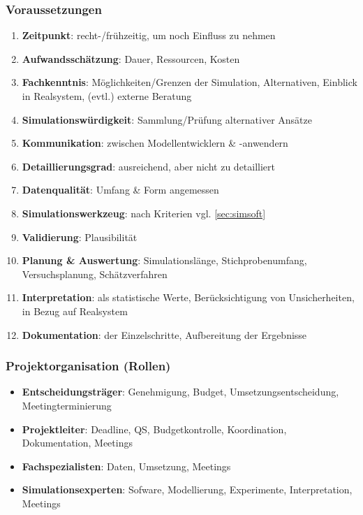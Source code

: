 \documentclass{article}
\begin{document}
\subsubsection{Voraussetzungen}
\begin{enumerate}
  \item \textbf{Zeitpunkt}: recht-/frühzeitig, um noch Einfluss zu nehmen
  \item \textbf{Aufwandsschätzung}: Dauer, Ressourcen, Kosten
  \item \textbf{Fachkenntnis}: Möglichkeiten/Grenzen der Simulation, Alternativen, Einblick in Realsystem, (evtl.) externe Beratung
  \item \textbf{Simulationswürdigkeit}: Sammlung/Prüfung alternativer Ansätze
  \item \textbf{Kommunikation}: zwischen Modellentwicklern \& -anwendern
  \item \textbf{Detaillierungsgrad}: ausreichend, aber nicht zu detailliert
  \item \textbf{Datenqualität}: Umfang \& Form angemessen
  \item \textbf{Simulationswerkzeug}: nach Kriterien vgl. \ref{sec:simsoft}
  \item \textbf{Validierung}: Plausibilität
  \item \textbf{Planung \& Auswertung}: Simulationslänge, Stichprobenumfang, Versuchsplanung, Schätzverfahren
  \item \textbf{Interpretation}: als statistische Werte, Berücksichtigung von Unsicherheiten, in Bezug auf Realsystem
  \item \textbf{Dokumentation}: der Einzelschritte, Aufbereitung der Ergebnisse
\end{enumerate}

\subsubsection{Projektorganisation (Rollen)}
\begin{itemize}
  \item \textbf{Entscheidungsträger}: Genehmigung, Budget, Umsetzungsentscheidung, Meetingterminierung
  \item \textbf{Projektleiter}: Deadline, QS, Budgetkontrolle, Koordination, Dokumentation, Meetings
  \item \textbf{Fachspezialisten}: Daten, Umsetzung, Meetings
  \item \textbf{Simulationsexperten}: Sofware, Modellierung, Experimente, Interpretation, Meetings
\end{itemize}
\end{document}
